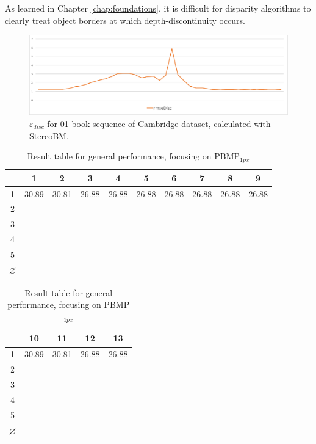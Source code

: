 \noindent As learned in Chapter \ref{chap:foundations}, it is difficult for disparity algorithms to clearly treat object borders at which depth-discontinuity occurs.

\begin{figure}[h!]
  \centering
  \includegraphics[width=1.0\textwidth]{src/images/evaluation/outliers/plot1.pdf}
  \caption{$\varepsilon_{disc}$ for 01-book sequence of Cambridge dataset, calculated with StereoBM.}
  \label{fig:plot1}
\end{figure}


\begin{table}[]
\centering
\begin{tabular}{c|ccccccccc}
  & 1 & 2 & 3 & 4 & 5 & 6 & 7 & 8 & 9 \\ \hline
1 & 30.89 & 30.81 & 26.88 & 26.88 & 26.88 & 26.88 & 26.88 & 26.88 & 26.88 \\
2 &   &   &   &   &   &   &   &   &  \\
3 &   &   &   &   &   &   &   &   &  \\
4 &   &   &   &   &   &   &   &   &  \\
5 &   &   &   &   &   &   &   &   &  \\ \hline
$\varnothing$ &   &   &   &   &   &   &   &   & 
\end{tabular}
\caption[Result table for general performance]{Result table for general performance, focusing on PBMP$_{1px}$}
\end{table}

\begin{table}[]
\centering
\begin{tabular}{c|cccc}
  & 10 & 11 & 12 & 13 \\ \hline
1 & 30.89 & 30.81 & 26.88 & 26.88 \\
2 &   &   &   &  \\
3 &   &   &   &  \\
4 &   &   &   &  \\
5 &   &   &   &  \\ \hline
$\varnothing$ &   &   &   & 
\end{tabular}
\caption[Result table for general performance]{Result table for general performance, focusing on PBMP$_{1px}$}
\end{table}

